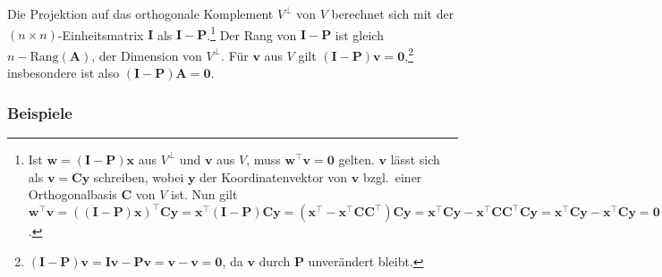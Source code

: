 Die Projektion auf das orthogonale Komplement $V^{\perp}$ von $V$ berechnet sich mit der $(n \times n)$-Einheitsmatrix $\bm{I}$ als $\bm{I} - \bm{P}$.\footnote{Ist $\bm{w} = (\bm{I} - \bm{P}) \bm{x}$ aus $V^{\perp}$ und $\bm{v}$ aus $V$, muss $\bm{w}^{\top} \bm{v} = \bm{0}$ gelten. $\bm{v}$ lässt sich als $\bm{v} = \bm{C} \bm{y}$ schreiben, wobei $\bm{y}$ der Koordinatenvektor von $\bm{v}$ bzgl.\ einer Orthogonalbasis $\bm{C}$ von $V$ ist. Nun gilt $\bm{w}^{\top} \bm{v} = ((\bm{I} - \bm{P}) \bm{x})^{\top} \bm{C} \bm{y} = \bm{x}^{\top} (\bm{I} - \bm{P}) \bm{C} \bm{y} = (\bm{x}^{\top} - \bm{x}^{\top} \bm{C} \bm{C}^{\top}) \bm{C} \bm{y} = \bm{x}^{\top} \bm{C} \bm{y} - \bm{x}^{\top} \bm{C} \bm{C}^{\top} \bm{C} \bm{y} = \bm{x}^{\top} \bm{C} \bm{y} - \bm{x}^{\top} \bm{C} \bm{y} = \bm{0}$.} Der Rang von $\bm{I} - \bm{P}$ ist gleich $n - \text{Rang}(\bm{A})$, der Dimension von $V^{\perp}$. Für $\bm{v}$ aus $V$ gilt $(\bm{I} - \bm{P}) \bm{v} = \bm{0}$,\footnote{$(\bm{I}-\bm{P}) \bm{v} = \bm{I} \bm{v} - \bm{P} \bm{v} = \bm{v} - \bm{v} = \bm{0}$, da $\bm{v}$ durch $\bm{P}$ unverändert bleibt.} insbesondere ist also $(\bm{I} - \bm{P}) \bm{A} = \bm{0}$.

\subsubsection{Beispiele}

